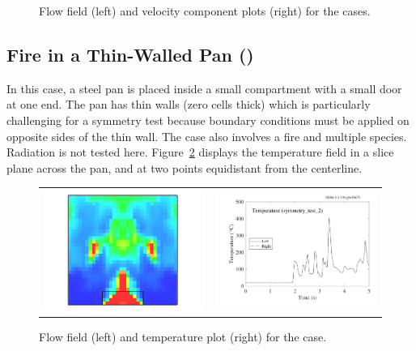 \documentclass[11pt]{book}
\begin{document}
\begin{figure}[!ht]
\begin{tabular*}{\textwidth}{lr}
\end{tabular*}
\caption[The  cases]{Flow field (left) and velocity component plots (right) for the  cases.}
\label{symmetry_test_fig}
\end{figure}

\subsection{Fire in a Thin-Walled Pan (\texorpdfstring{}{symmetry\_test\_2})}
\label{symmetry_test_2}

In this case, a steel pan is placed inside a small compartment with a small door at one end. The pan has thin walls (zero cells thick) which is particularly challenging for a symmetry test because boundary conditions must be applied on opposite sides of the thin wall. The case also involves a fire and multiple species. Radiation is not tested here. Figure~\ref{symmetry_test_2_fig} displays the temperature field in a slice plane across the pan, and at two points equidistant from the centerline.


\begin{figure}[!ht]
\begin{tabular*}{\textwidth}{lr}
\includegraphics[width=3.2in]{SCRIPT_FIGURES/symmetry_test_2} &
\includegraphics[width=3.2in]{SCRIPT_FIGURES/symmetry_test_2_plot} 
\end{tabular*}
\caption[The  case]{Flow field (left) and temperature plot (right) for the  case.}
\label{symmetry_test_2_fig}
\end{figure}
\end{document}
